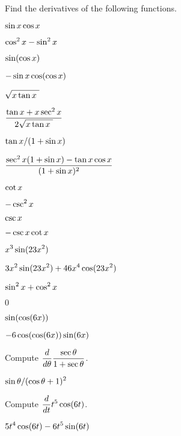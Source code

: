 \begin{exercises}
Find the derivatives of the following functions.

\twocol

\exercise $\displaystyle \sin x\cos x$
\begin{answer} $\displaystyle \cos^2 x-\sin^2 x$
\end{answer}

\exercise $\displaystyle \sin(\cos x)$
\begin{answer} $\displaystyle -\sin x\cos(\cos x)$
\end{answer}

\exercise $\displaystyle \sqrt{x\tan x\ }$
\begin{answer} $\ds{\tan x+x\sec^2 x\over2\sqrt{x\tan x\ }}$
\end{answer}

\exercise $\displaystyle \tan x/(1+\sin x)$
\begin{answer} $\displaystyle {\sec^2 x(1+\sin x)-\tan x \cos x\over (1+\sin x)^2}$
\end{answer}

\exercise $\displaystyle \cot x$
\begin{answer} $\displaystyle  -\csc^2 x$
\end{answer}

\exercise $\displaystyle \csc x$
\begin{answer} $\displaystyle  -\csc x\cot x$
\end{answer}

\exercise $\displaystyle x^3 \sin (23x^2 )$
\begin{answer} $\displaystyle 3x^2\sin(23x^2)+46x^4\cos(23x^2)$
\end{answer}

\exercise $\displaystyle \sin ^2 x + \cos ^2 x$
 \begin{answer} $0$
\end{answer}

\exercise  $\displaystyle \sin (\cos (6x) )$
 \begin{answer} $\displaystyle -6\cos(\cos(6x))\sin(6x)$
\end{answer}

\endtwocol

\exercise Compute $\displaystyle{d\over d\theta}{\sec \theta\over 1+\sec \theta}$.
 \begin{answer} $\displaystyle \sin\theta/(\cos\theta+1)^2$
\end{answer}

\exercise Compute $\displaystyle{d\over dt}t^5 \cos (6t)$.
\begin{answer} $\displaystyle 5t^4\cos(6t)-6t^5\sin(6t)$
\end{answer}


\end{exercises}
